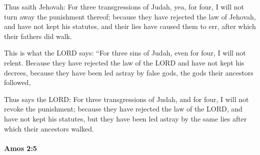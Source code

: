 			\begin{versebox}
					\item[BHS] 
					\item[LXX] 
					\item[ASV] Thus saith Jehovah: For three transgressions of Judah, yea, for four, I will not turn away the punishment thereof; because they have rejected the law of Jehovah, and have not kept his statutes, and their lies have caused them to err, after which their fathers did walk.
					\item[NIV] This is what the LORD says: “For three sins of Judah, even for four, I will not relent. Because they have rejected the law of the LORD and have not kept his decrees, because they have been led astray by false gods, the gods their ancestors followed,
					\item[NRSV] Thus says the LORD: For three transgressions of Judah, and for four, I will not revoke the punishment; because they have rejected the law of the LORD, and have not kept his statutes, but they have been led astray by the same lies after which their ancestors walked.
			\end{versebox}

		\paragraph{Amos 2:5} %
			\label{AMOS-2-5}


